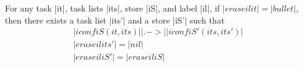 
\begin{lemma}
  \label{lemma:high-not-blocking}
  For any task |it|, task lists |its|, store |iS|, and label |il|, if
  $|erase il it|=|bullet|$, then there exists a task list
  |its'| and a store |iS'| such that
  \begin{align}
  |iconf iS (it, its)| |.->| |iconf iS' (its, its')| \label{eq:hnb-1} \\
  |erase il its'|=|nil| \label{eq:hnb-2}\\
  |erase il iS'|=|erase il iS| \label{eq:hnb-3}
  \end{align}
\end{lemma}
